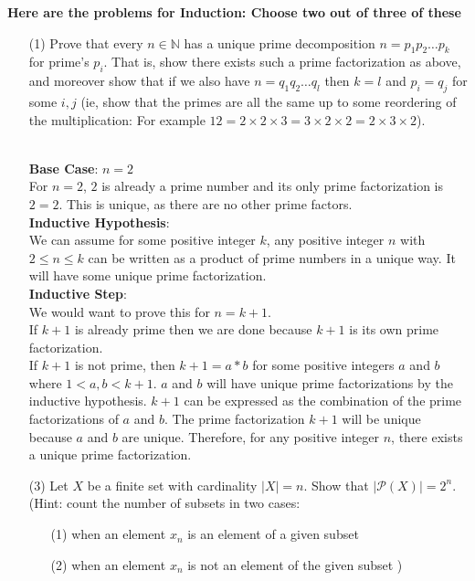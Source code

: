 \documentclass[answers,12pt]{exam}
\newcommand{\br}{\hfill \break}
\newcommand{\N}{\mathbb{N}}
\newcommand{\bs}{\begin{solution}}
\newcommand{\es}{\end{solution}}
\begin{document}
\br
\textbf{Here are the problems for Induction: Choose two out of three of these}
\begin{enumerate}
    \item [(1)] Prove that every \(n \in \N\) has a unique prime decomposition \(n = p_1 p_2 \dots p_k\) for prime's \(p_i\). That is, show there exists such a prime factorization as above, and moreover show that if we also have \(n=q_1q_2 \dots q_l\) then \(k=l\) and \(p_i=q_j\) for some \(i, j\) (ie, show that the primes are all the same up to some reordering of the multiplication: For example \(12 =2 \times2 \times 3 = 3 \times 2 \times 2 = 2 \times 3 \times 2\)).
    \bs\\
    \textbf{Base Case}: \(n = 2\)\\
    For \(n = 2\), \(2\) is already a prime number and its only prime factorization is \(2 = 2\). This is unique, as there are no other prime factors.\\
    \textbf{Inductive Hypothesis}:\\
    We can assume for some positive integer \(k\), any positive integer \(n\) with \(2 \leq n \leq k\) can be written as a product of prime numbers in a unique way. It will have some unique prime factorization.\\
    \textbf{Inductive Step}:\\
    We would want to prove this for \(n = k+1\).\\
    If \(k+1\) is already prime then we are done because \(k+1\) is its own prime factorization.\\
    If \(k+1\) is not prime, then \(k + 1 = a * b\) for some positive integers \(a\) and \(b\) where \(1 < a,b < k + 1\). \(a\) and \(b\) will have unique prime factorizations by the inductive hypothesis. \(k+1\) can be expressed as the combination of the prime factorizations of \(a\) and \(b\). The prime factorization \(k+1\) will be unique because \(a\) and \(b\) are unique. Therefore, for any positive integer \(n\), there exists a unique prime factorization.
    \es
    \item [(3)] Let \(X\) be a finite set with cardinality \( |X| = n\). Show that \(|\mathcal{P}(X)| = 2^n\). \\
    (Hint: count the number of subsets in two cases: \begin{enumerate}
        \item [(1)] when an element \(x_n\) is an element of a given subset
        \item [(2)] when an element \(x_n\) is not an element of the given subset )

\end{enumerate}
\end{enumerate}
\end{document}
